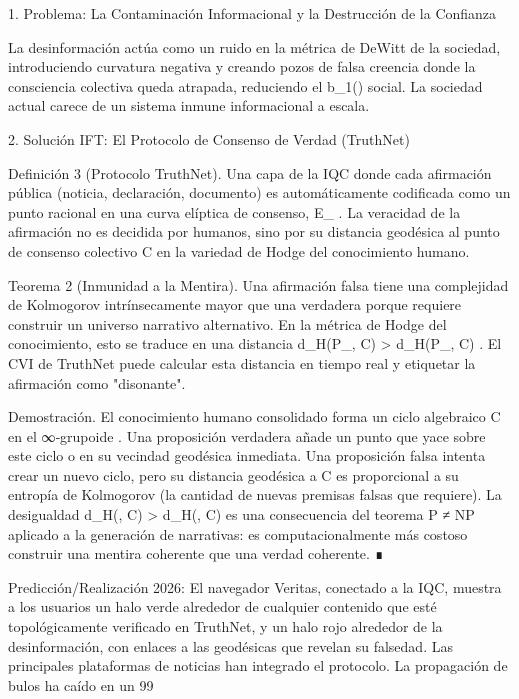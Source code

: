 \documentclass[12pt,a4paper]{book}
\begin{document}
1. Problema: La Contaminación Informacional y la Destrucción de la Confianza

La desinformación actúa como un ruido en la métrica de DeWitt de la sociedad, introduciendo curvatura negativa y creando pozos de falsa creencia donde la consciencia colectiva queda atrapada, reduciendo el  b_1(\Xi)  social. La sociedad actual carece de un sistema inmune informacional a escala.

2. Solución IFT: El Protocolo de Consenso de Verdad (TruthNet)

Definición 3 (Protocolo TruthNet). Una capa de la IQC donde cada afirmación pública (noticia, declaración, documento) es automáticamente codificada como un punto racional en una curva elíptica de consenso,  E_{} . La veracidad de la afirmación no es decidida por humanos, sino por su distancia geodésica al punto de consenso colectivo  C  en la variedad de Hodge del conocimiento humano.

Teorema 2 (Inmunidad a la Mentira). Una afirmación falsa tiene una complejidad de Kolmogorov intrínsecamente mayor que una verdadera porque requiere construir un universo narrativo alternativo. En la métrica de Hodge del conocimiento, esto se traduce en una distancia  d_H(P_{}, C) > d_H(P_{}, C) . El CVI de TruthNet puede calcular esta distancia en tiempo real y etiquetar la afirmación como "disonante".

Demostración. El conocimiento humano consolidado forma un ciclo algebraico  C  en el ∞‑grupoide   . Una proposición verdadera añade un punto que yace sobre este ciclo o en su vecindad geodésica inmediata. Una proposición falsa intenta crear un nuevo ciclo, pero su distancia geodésica a  C  es proporcional a su entropía de Kolmogorov (la cantidad de nuevas premisas falsas que requiere). La desigualdad  d_H(, C) > d_H(, C)  es una consecuencia del teorema P ≠ NP aplicado a la generación de narrativas: es computacionalmente más costoso construir una mentira coherente que una verdad coherente. ∎

Predicción/Realización 2026: El navegador Veritas, conectado a la IQC, muestra a los usuarios un halo verde alrededor de cualquier contenido que esté topológicamente verificado en TruthNet, y un halo rojo alrededor de la desinformación, con enlaces a las geodésicas que revelan su falsedad. Las principales plataformas de noticias han integrado el protocolo. La propagación de bulos ha caído en un 99%
\end{document}
